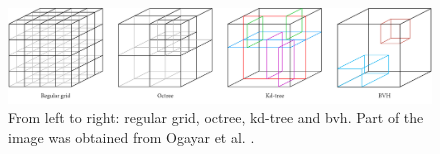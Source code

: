 \begin{figure}[ht]
	\includegraphics[width=\linewidth]{figs/fundamentals/data_structures.png}
	\caption{From left to right: regular grid, octree, kd-tree and \acrshort{bvh}. Part of the image was obtained from Ogayar et al. \cite{ogayar-anguita_nested_2023}. }
    \label{fig:data_structures_indexing}
\end{figure}